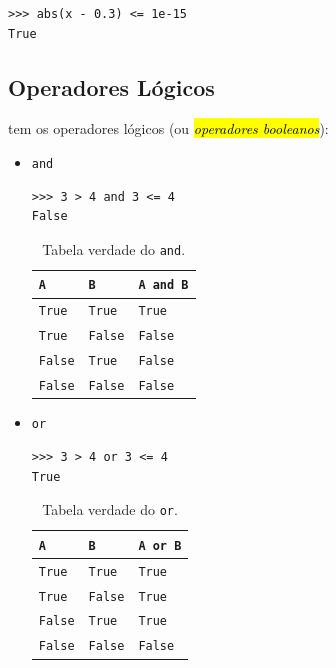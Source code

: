 \begin{lstlisting}
>>> abs(x - 0.3) <= 1e-15
True
\end{lstlisting}

\subsection{Operadores Lógicos}

{\python} tem os operadores lógicos (ou \hl{\emph{operadores booleanos}}):
\begin{itemize}
\item \lstinline+and+ 

\begin{lstlisting}[xrightmargin=2.5em]
>>> 3 > 4 and 3 <= 4
False
\end{lstlisting}

  \begin{table}[H]
    \centering
    \caption{Tabela verdade do \lstinline+and+.}
    \begin{tabular}{ll|l}
      {\lstinline+A+} & {\lstinline+B+} & {\lstinline+A and B+}\\\hline
      {\lstinline+True+} & {\lstinline+True+} & {\lstinline+True+}\\
      {\lstinline+True+} & {\lstinline+False+} & {\lstinline+False+}\\
      {\lstinline+False+} & {\lstinline+True+} & {\lstinline+False+}\\
      {\lstinline+False+} & {\lstinline+False+} & {\lstinline+False+}\\\hline
    \end{tabular}
  \end{table}

\ifisbook
\newpage
\fi

\item \lstinline+or+ 

\begin{lstlisting}[xrightmargin=2.5em]
>>> 3 > 4 or 3 <= 4
True
\end{lstlisting}

  \begin{table}[H]
    \centering
    \caption{Tabela verdade do \lstinline+or+.}
    \begin{tabular}{ll|l}
      {\lstinline+A+}     & {\lstinline+B+}     & {\lstinline+A or B+} \\\hline
      {\lstinline+True+}  & {\lstinline+True+}  & {\lstinline+True+} \\
      {\lstinline+True+}  & {\lstinline+False+} & {\lstinline+True+} \\
      {\lstinline+False+} & {\lstinline+True+ } & {\lstinline+True+} \\
      {\lstinline+False+} & {\lstinline+False+} & {\lstinline+False+} \\\hline
    \end{tabular}
  \end{table}


\end{itemize}

